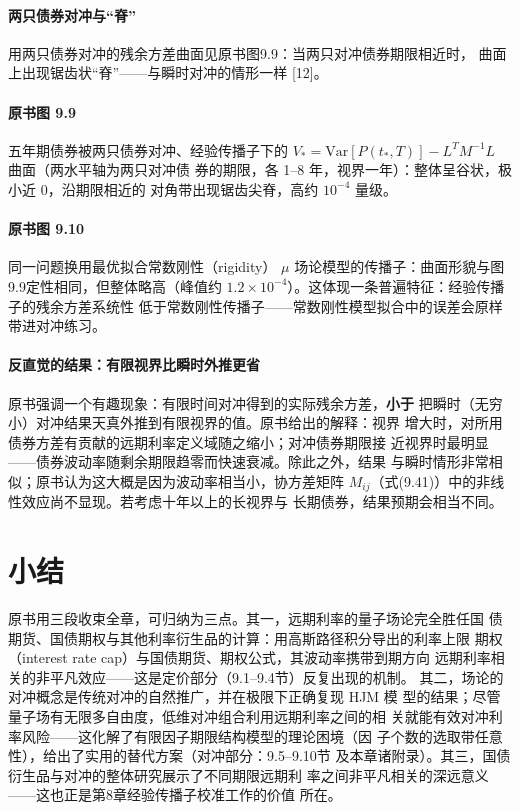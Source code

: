 \paragraph{两只债券对冲与“脊”}
用两只债券对冲的残余方差曲面见原书图9.9：当两只对冲债券期限相近时，
曲面上出现锯齿状“脊”——与瞬时对冲的情形一样 [12]。

\paragraph{原书图 9.9}\quad 五年期债券被两只债券对冲、经验传播子下的
$V_*=\mathrm{Var}[P(t_*,T)]-L^{T}M^{-1}L$ 曲面（两水平轴为两只对冲债
券的期限，各 1--8 年，视界一年）：整体呈谷状，极小近 0，沿期限相近的
对角带出现锯齿尖脊，高约 $10^{-4}$ 量级。

\paragraph{原书图 9.10}\quad 同一问题换用最优拟合常数刚性（rigidity）
$\mu$ 场论模型的传播子：曲面形貌与图9.9定性相同，但整体略高（峰值约
$1.2\times10^{-4}$）。这体现一条普遍特征：经验传播子的残余方差系统性
低于常数刚性传播子——常数刚性模型拟合中的误差会原样带进对冲练习。

\paragraph{反直觉的结果：有限视界比瞬时外推更省}
原书强调一个有趣现象：有限时间对冲得到的实际残余方差，\textbf{小于}
把瞬时（无穷小）对冲结果天真外推到有限视界的值。原书给出的解释：视界
增大时，对所用债券方差有贡献的远期利率定义域随之缩小；对冲债券期限接
近视界时最明显——债券波动率随剩余期限趋零而快速衰减。除此之外，结果
与瞬时情形非常相似；原书认为这大概是因为波动率相当小，协方差矩阵
$M_{ij}$（式(9.41)）中的非线性效应尚不显现。若考虑十年以上的长视界与
长期债券，结果预期会相当不同。

\section{小结}

原书用三段收束全章，可归纳为三点。其一，远期利率的量子场论完全胜任国
债期货、国债期权与其他利率衍生品的计算：用高斯路径积分导出的利率上限
期权（interest rate cap）与国债期货、期权公式，其波动率携带到期方向
远期利率相关的非平凡效应——这是定价部分（9.1--9.4节）反复出现的机制。
其二，场论的对冲概念是传统对冲的自然推广，并在极限下正确复现 HJM 模
型的结果；尽管量子场有无限多自由度，低维对冲组合利用远期利率之间的相
关就能有效对冲利率风险——这化解了有限因子期限结构模型的理论困境（因
子个数的选取带任意性），给出了实用的替代方案（对冲部分：9.5--9.10节
及本章诸附录）。其三，国债衍生品与对冲的整体研究展示了不同期限远期利
率之间非平凡相关的深远意义——这也正是第8章经验传播子校准工作的价值
所在。

